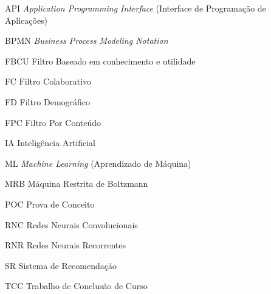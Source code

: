 \begin{siglas}
  \item[API] \textit{Application Programming Interface} (Interface de Programação de Aplicações)
  \item[BPMN] \textit{Business Process Modeling Notation}
  \item[FBCU] Filtro Baseado em conhecimento e utilidade
  \item[FC] Filtro Colaborativo
  \item[FD] Filtro Demográfico
  \item[FPC] Filtro Por Conteúdo
  \item[IA] Inteligência Artificial
  \item[ML] \textit{Machine Learning} (Aprendizado de Máquina)
  \item[MRB] Máquina Restrita de Boltzmann
  \item[POC] Prova de Conceito
  \item[RNC] Redes Neurais Convolucionais
  \item[RNR] Redes Neurais Recorrentes
  \item[SR] Sistema de Recomendação
  \item[TCC] Trabalho de Conclusão de Curso
\end{siglas}
